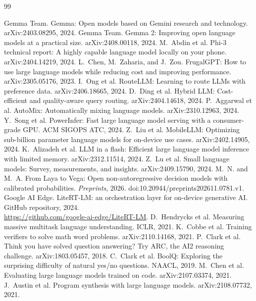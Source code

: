 \documentclass[11pt,a4paper]{article}
\begin{document}
\begin{thebibliography}{99}
\footnotesize
\setlength{\itemsep}{0pt}\setlength{\parsep}{0pt}\setlength{\parskip}{0pt}

 Gemma Team. Gemma: Open models based on Gemini research and
technology. arXiv:2403.08295, 2024.
 Gemma Team. Gemma 2: Improving open language models at a
practical size. arXiv:2408.00118, 2024.
 M.~Abdin et al. Phi-3 technical report: A highly capable language
model locally on your phone. arXiv:2404.14219, 2024.
 L.~Chen, M.~Zaharia, and J.~Zou. FrugalGPT: How to use large
language models while reducing cost and improving performance. arXiv:2305.05176,
2023.
 I.~Ong et al. RouteLLM: Learning to route LLMs with
preference data. arXiv:2406.18665, 2024.
 D.~Ding et al. Hybrid LLM: Cost-efficient and quality-aware
query routing. arXiv:2404.14618, 2024.
 P.~Aggarwal et al. AutoMix: Automatically mixing language
models. arXiv:2310.12963, 2024.
 Y.~Song et al. PowerInfer: Fast large language model
serving with a consumer-grade GPU. ACM SIGOPS ATC, 2024.
 Z.~Liu et al. MobileLLM: Optimizing sub-billion parameter
language models for on-device use cases. arXiv:2402.14905, 2024.
 K.~Alizadeh et al. LLM in a flash: Efficient large language
model inference with limited memory. arXiv:2312.11514, 2024.
 Z.~Lu et al. Small language models: Survey, measurements, and
insights. arXiv:2409.15790, 2024.
 M.~N. and M.~A. From Laya to Vega: Open non-autoregressive
decision models with calibrated probabilities. \emph{Preprints}, 2026.
doi:10.20944/preprints202611.0781.v1.
 Google AI Edge. LiteRT-LM: an orchestration layer for
on-device generative AI. GitHub repository, 2024.\\
\url{https://github.com/google-ai-edge/LiteRT-LM}.
 D.~Hendrycks et al. Measuring massive multitask language
understanding. ICLR, 2021.
 K.~Cobbe et al. Training verifiers to solve math word problems.
arXiv:2110.14168, 2021.
 P.~Clark et al. Think you have solved question answering?
Try ARC, the AI2 reasoning challenge. arXiv:1803.05457, 2018.
 C.~Clark et al. BoolQ: Exploring the surprising difficulty of
natural yes/no questions. NAACL, 2019.
 M.~Chen et al. Evaluating large language models trained on
code. arXiv:2107.03374, 2021.
 J.~Austin et al. Program synthesis with large language models.
arXiv:2108.07732, 2021.

\end{thebibliography}
\end{document}
